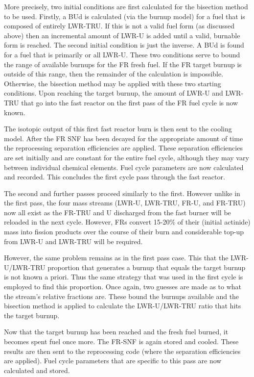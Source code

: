More precisely, two initial conditions are first calculated for the bisection method to be used.  
Firstly, a BUd is calculated (via the burnup model) for a fuel that is composed of entirely LWR-TRU.  
If this is not a valid fuel form (as discussed above) then an incremental amount of LWR-U is added 
until a valid, burnable form is reached.  The second initial condition is just the inverse.  A BUd 
is found for a fuel that is primarily or all LWR-U.  These two conditions serve to bound the range 
of available burnups for the FR fresh fuel.  If the FR target burnup is outside of this range, then 
the remainder of the calculation is impossible.  Otherwise, the bisection method may be applied with 
these two starting conditions.  Upon reaching the target burnup, the amount of LWR-U and LWR-TRU that 
go into the fast reactor on the first pass of the FR fuel cycle is now known.

The isotopic output of this first fast reactor burn is then sent to the cooling model.   After the FR 
SNF has been decayed for the appropriate amount of time the reprocessing separation efficiencies are 
applied.  These separation efficiencies are set initially and are constant for the entire fuel cycle, 
although they may vary between individual chemical elements.  Fuel cycle parameters are now calculated 
and recorded.  This concludes the first cycle pass through the fast reactor.  

The second and further passes proceed similarly to the first.  However unlike in the first pass, the 
four mass streams (LWR-U, LWR-TRU, FR-U, and FR-TRU) now all exist as the FR-TRU and U discharged from 
the fast burner will be reloaded in the next cycle.  However, FRs convert 15-20\% of their (initial 
actinide) mass into fission products over the course of their burn and considerable top-up from LWR-U 
and LWR-TRU will be required.  

However, the same problem remains as in the first pass case.  This that the LWR-U/LWR-TRU proportion 
that generates a burnup that equals the target burnup is not known a priori.  Thus the same strategy 
that was used in the first cycle is employed to find this proportion.  Once again, two guesses are 
made as to what the stream’s relative fractions are.  These bound the burnups available and the 
bisection method is applied to calculate the LWR-U/LWR-TRU ratio that hits the target burnup.  

Now that the target burnup has been reached and the fresh fuel burned, it becomes spent fuel once 
more.  The FR-SNF is again stored and cooled.  These results are then sent to the reprocessing code 
(where the separation efficiencies are applied).  Fuel cycle parameters that are specific to this 
pass are now calculated and stored.


